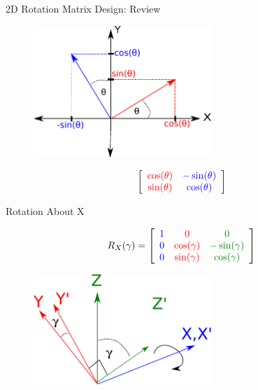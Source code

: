 \documentclass{beamer}
\begin{document}
\begin{frame}{2D Rotation Matrix Design: Review}

\begin{figure}[t]
	\centering
    \includegraphics[width=0.6\textwidth]{ColumnVectorRot2.pdf}
\end{figure}


\[ \left[ \begin{array}{cc} \textcolor{red}{\cos(\theta)} & \textcolor{blue}{-\sin(\theta)} \\ \textcolor{red}{\sin(\theta)} & \textcolor{blue}{\cos(\theta)} \end{array}  \right] \]

\end{frame}

\begin{frame}{Rotation About X}

\[ R_X(\gamma) = \left[ \begin{array}{ccc} \textcolor{blue}{1} & \textcolor{red}{0} & \textcolor{darkgreen}{0} \\ \textcolor{blue}{0} & \textcolor{red}{\cos(\gamma)} & \textcolor{darkgreen}{-\sin(\gamma)}  \\ \textcolor{blue}{0} & \textcolor{red}{\sin(\gamma)} & \textcolor{darkgreen}{\cos(\gamma)} \end{array}\right] \]

\begin{figure}[t]
	\centering
	\includegraphics[width=0.6\textwidth]{3DRotX.pdf}
\end{figure}

\end{frame}
\end{document}
